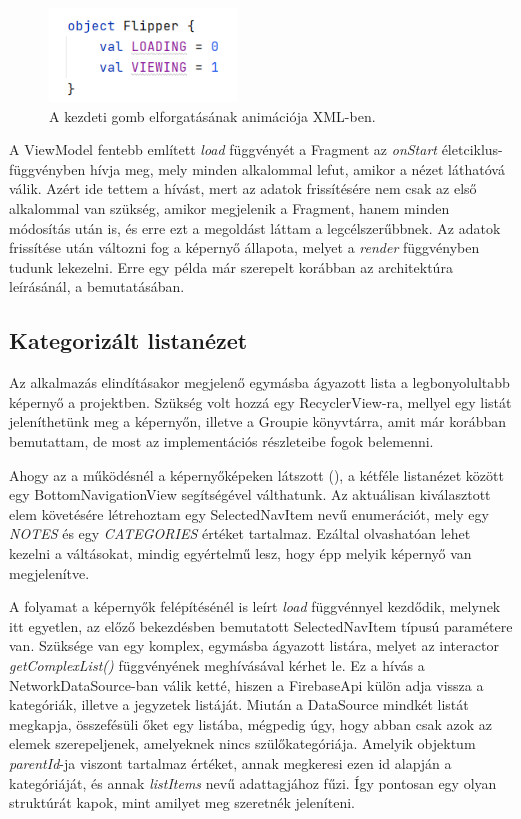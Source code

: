 \begin{figure}[!ht]
	\centering
	\includegraphics[width=50mm, keepaspectratio]{figures/viewflipper_object.png}
	\caption{A kezdeti gomb elforgatásának animációja XML-ben.}
	\label{fig:ViewFlipperObject}
\end{figure}

A ViewModel fentebb említett \emph{load} függvényét a Fragment az \emph{onStart} életciklus-függvényben hívja meg, mely minden alkalommal lefut, amikor a nézet láthatóvá válik. Azért ide tettem a hívást, mert az adatok frissítésére nem csak az első alkalommal van szükség, amikor megjelenik a Fragment, hanem minden módosítás után is, és erre ezt a megoldást láttam a legcélszerűbbnek. Az adatok frissítése után változni fog a képernyő állapota, melyet a \emph{render} függvényben tudunk lekezelni. Erre egy példa már szerepelt korábban az architektúra leírásánál, a  bemutatásában.

\subsection{Kategorizált listanézet}
Az alkalmazás elindításakor megjelenő egymásba ágyazott lista a legbonyolultabb képernyő a projektben. Szükség volt hozzá egy RecyclerView-ra, mellyel egy listát jeleníthetünk meg a képernyőn, illetve a Groupie könyvtárra, amit már korábban bemutattam, de most az implementációs részleteibe fogok belemenni. 

Ahogy az a működésnél a képernyőképeken látszott (), a kétféle listanézet között egy BottomNavigationView segítségével válthatunk. Az aktuálisan kiválasztott elem követésére létrehoztam egy SelectedNavItem nevű enumerációt, mely egy \emph{NOTES} és egy \emph{CATEGORIES} értéket tartalmaz. Ezáltal olvashatóan lehet kezelni a váltásokat, mindig egyértelmű lesz, hogy épp melyik képernyő van megjelenítve.

A folyamat a képernyők felépítésénél is leírt \emph{load} függvénnyel kezdődik, melynek itt egyetlen, az előző bekezdésben bemutatott SelectedNavItem típusú paramétere van. Szüksége van egy komplex, egymásba ágyazott listára, melyet az interactor \emph{getComplexList()} függvényének meghívásával kérhet le. Ez a hívás a NetworkDataSource-ban válik ketté, hiszen a FirebaseApi külön adja vissza a kategóriák, illetve a jegyzetek listáját. Miután a DataSource mindkét listát megkapja, összefésüli őket egy listába, mégpedig úgy, hogy abban csak azok az elemek szerepeljenek, amelyeknek nincs szülőkategóriája. Amelyik objektum \emph{parentId}-ja viszont tartalmaz értéket, annak megkeresi ezen id alapján a kategóriáját, és annak \emph{listItems} nevű adattagjához fűzi. Így pontosan egy olyan struktúrát kapok, mint amilyet meg szeretnék jeleníteni.

